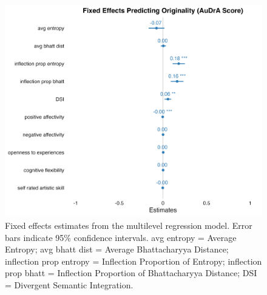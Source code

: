 \documentclass[../MA_Thesis.tex]{subfiles}
\begin{document}
\begin{figure}[H]
  \centering
  \includegraphics[width=\textwidth]{../analysis/results/main_results/multilevel_regression/fixed_effects_plott.png}
  \caption{Fixed effects estimates from the multilevel regression model. Error bars indicate 95\% confidence intervals. avg entropy = Average Entropy; avg bhatt dist = Average Bhattacharyya Distance; inflection prop entropy = Inflection Proportion of Entropy; inflection prop bhatt = Inflection Proportion of Bhattacharyya Distance; DSI = Divergent Semantic Integration.}
  \label{fig:coef_plot}
\end{figure}
\end{document}
